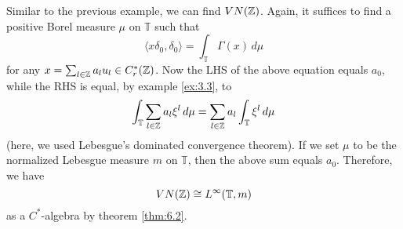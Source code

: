 \begin{example} 
  Similar to the previous example, we can find $VN(\mathbb {Z})$.
  Again, it suffices to find a positive Borel measure $\mu$ on $\mathbb{T}$ such that 
  $$\langle x \delta_0, \delta_0 \rangle = \int_{\mathbb{T}} \Gamma (x)\, d\mu$$
  for any $x = \sum_{l \in \mathbb {Z}} a_l u_l \in C_r ^* (\mathbb {Z})$. Now the LHS of the above equation equals $a_0$,
  while the RHS is equal, by example \ref{ex:3.3}, to 
  $$\int_{\mathbb{T}} \sum_{l \in \mathbb {Z}} a_l \xi^l\, d\mu = \sum_{l \in \mathbb {Z}}  a_l \int_{\mathbb{T}} \xi^l \, d\mu$$
  (here, we used Lebesgue's dominated convergence theorem).
  If we set $\mu$ to be the normalized Lebesgue measure $m$ on $\mathbb{T}$, then the above sum equals $a_0$.
  Therefore, we have 
  $$VN(\mathbb {Z}) \cong L^\infty (\mathbb{T}, m)$$
  as a $C^*$-algebra by theorem \ref{thm:6.2}.
\end{example}

